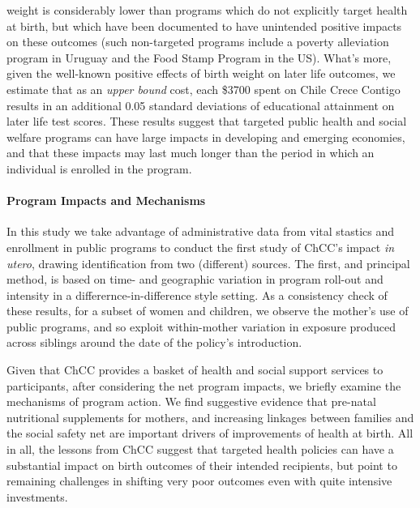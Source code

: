 \documentclass[12pt]{article}
\begin{document}
\begin{spacing}{1.4}
weight is considerably lower than programs which do not explicitly target
health at birth, but which have been documented to have unintended positive
impacts on these outcomes
(such non-targeted programs include a poverty alleviation program in
Uruguay and the Food Stamp Program in the US). What's more, given the well-known
positive effects of birth weight on later life outcomes, we estimate that
as an \emph{upper bound} cost, each \$3700 spent on Chile Crece Contigo
results in an additional 0.05 standard deviations of educational attainment
on later life test scores.  These results suggest that targeted public
health and social welfare programs can have large impacts in developing
and emerging economies, and that these impacts may last much longer than
the period in which an individual is enrolled in the program.  

\paragraph{Program Impacts and Mechanisms}
In this study we take advantage of administrative data from vital stastics
and enrollment in public programs to conduct the first study of ChCC's
impact \emph{in utero}, drawing identification from two (different) sources.
The first, and principal method, is based on time- and geographic variation
in program roll-out and intensity in a differernce-in-difference style
setting.  As a consistency check of these results, for a subset of women and
children, we observe the mother's use of public programs, and so exploit
within-mother variation in exposure produced across siblings around the date
of the policy's introduction.

Given that ChCC provides a basket of health and social support services to
participants, after considering the net program impacts, we briefly examine
the mechanisms of program action.  We find suggestive evidence that pre-natal
nutritional supplements
for mothers, and increasing linkages between families and the social
safety net are important drivers of improvements of health at birth.
All in all, the lessons from ChCC suggest that targeted health policies
can have a substantial impact on birth outcomes of their intended
recipients, but point to remaining challenges in shifting very poor
outcomes even with quite intensive investments.  


\end{spacing}
\end{document}
